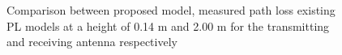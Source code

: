 \begin{figure}[H]
\centering

\caption{Comparison between proposed model, measured path loss existing PL models at a height of 0.14 m and 2.00 m for the transmitting and receiving antenna respectively}
\label{ourModel2}
\end{figure}








     
